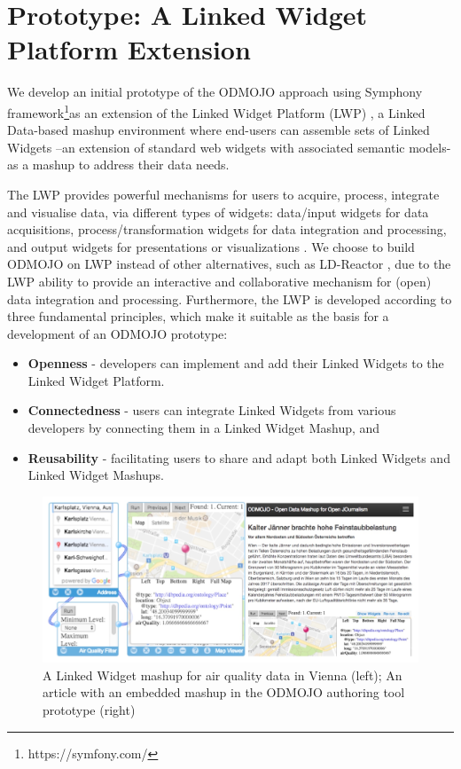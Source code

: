 \documentclass[runningheads,a4paper]{llncs}
\makeatletter
\def\maxwidth#1{\ifdim\Gin@nat@width>#1 #1\else\Gin@nat@width\fi}
\makeatother
\begin{document}
\section{Prototype: A Linked Widget Platform Extension}

We develop an initial prototype of the ODMOJO approach using Symphony framework\footnote{ https://symfony.com/}\textsuperscript{}as an extension of the Linked Widget Platform (LWP)  \cite{_Ref490834161} \cite{_Ref490834164}, a Linked Data-based mashup environment where end-users can assemble sets of Linked Widgets --an extension of standard web widgets with associated semantic models- as a mashup to address their data needs.

The LWP provides powerful mechanisms for users to acquire, process, integrate and visualise data, via different types of widgets: data/input widgets for data acquisitions, process/transformation widgets for data integration and processing, and output widgets for presentations or visualizations  \cite{_Ref490834164} \cite{_Ref490834161}. We choose to build ODMOJO on LWP instead of other alternatives, such as LD-Reactor  \cite{_Ref490834032}, due to the LWP ability to provide an interactive and collaborative mechanism for (open) data integration and processing. Furthermore, the LWP is developed according to three fundamental principles, which make it suitable as the basis for a development of an ODMOJO prototype: 
\begin{itemize}
\item {\bf Openness} - developers can implement and add their Linked Widgets to the Linked Widget Platform. 
\item {\bf Connectedness} - users can integrate Linked Widgets from various developers by connecting them in a Linked Widget Mashup, and
\item {\bf Reusability} - facilitating users to share and adapt both Linked Widgets and Linked Widget Mashups.
\end{itemize}
\begin{figure}[h!]
\centering
\includegraphics[width=\maxwidth{\textwidth}]{./img/image2.jpeg}
\cprotect\caption{ A Linked Widget mashup for air quality data in Vienna (left); An article with an embedded mashup in the ODMOJO authoring tool prototype (right)}
\label{_Ref490486042}
\end{figure}
\end{document}
